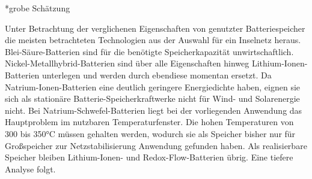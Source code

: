 *grobe Schätzung


Unter Betrachtung der verglichenen Eigenschaften von genutzter Batteriespeicher die meisten betrachteten Technologien 
aus der Auswahl für ein Inselnetz heraus. Blei-Säure-Batterien sind für die benötigte Speicherkapazität unwirtschaftlich. 
Nickel-Metallhybrid-Batterien sind über alle Eigenschaften hinweg Lithium-Ionen-Batterien unterlegen und werden durch ebendiese momentan ersetzt. 
Da Natrium-Ionen-Batterien eine deutlich geringere Energiedichte haben, eignen sie sich 
als stationäre Batterie-Speicherkraftwerke nicht für Wind- und Solarenergie nicht. 
Bei Natrium-Schwefel-Batterien liegt bei der vorliegenden Anwendung das Hauptproblem im nutzbaren Temperaturfenster. 
Die hohen Temperaturen von 300 bis 350°C müssen gehalten werden, wodurch sie als Speicher bisher nur 
für Großspeicher zur Netzstabilisierung Anwendung gefunden haben. 
Als realisierbare Speicher bleiben Lithium-Ionen- und Redox-Flow-Batterien übrig. 
Eine tiefere Analyse folgt.

